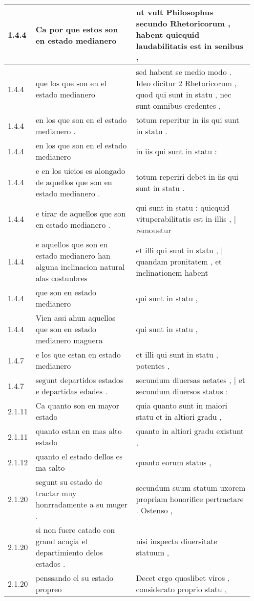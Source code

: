 \begin{tabular}{|p{1cm}|p{6.5cm}|p{6.5cm}|}
1.4.4 & Ca por que estos son en estado medianero & ut vult Philosophus secundo Rhetoricorum , habent quicquid laudabilitatis est in senibus , \\\hline
1.4.4 & que los que son en el estado medianero & sed habent se medio modo . Ideo dicitur 2 Rhetoricorum , quod qui sunt in statu , nec sunt omnibus credentes , \\\hline
1.4.4 & en los que son en el estado medianero . & totum reperitur in iis qui sunt in statu . \\\hline
1.4.4 & en los que son en el estado medianero & in iis qui sunt in statu : \\\hline
1.4.4 & e en los uieios es alongado de aquellos que son en estado medianero . & totum reperiri debet in iis qui sunt in statu . \\\hline
1.4.4 & e tirar de aquellos que son en estado medianero . & qui sunt in statu : quicquid vituperabilitatis est in illis , | remouetur \\\hline
1.4.4 & e aquellos que son en estado medianero han alguna inclinacion natural alas costunbres & et illi qui sunt in statu , | quandam pronitatem , et inclinationem habent \\\hline
1.4.4 & que son en estado medianero & qui sunt in statu , \\\hline
1.4.4 & Vien assi ahun aquellos que son en estado medianero maguera & qui sunt in statu , \\\hline
1.4.7 & e los que estan en estado medianero & et illi qui sunt in statu , potentes , \\\hline
1.4.7 & segunt departidos estados e departidas edades . & secundum diuersas aetates , | et secundum diuersos status : \\\hline
2.1.11 & Ca quanto son en mayor estado & quia quanto sunt in maiori statu et in altiori gradu , \\\hline
2.1.11 & quanto estan en mas alto estado & quanto in altiori gradu existunt , \\\hline
2.1.12 & quanto el estado dellos es ma salto & quanto eorum status , \\\hline
2.1.20 & segunt su estado de tractar muy honrradamente a su muger . & secundum suum statum uxorem propriam honorifice pertractare . Ostenso , \\\hline
2.1.20 & si non fuere catado con grand acuçia el departimiento delos estados . & nisi inspecta diuersitate statuum , \\\hline
2.1.20 & penssando el su estado propreo & Decet ergo quoslibet viros , considerato proprio statu , \\\hline

\end{tabular}
